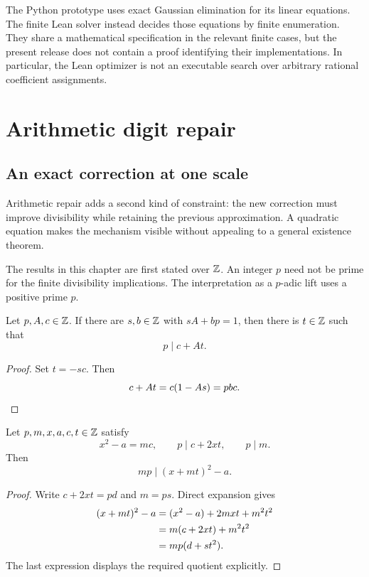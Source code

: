 The Python prototype uses exact Gaussian elimination for its linear equations. The finite Lean solver instead decides those equations by finite enumeration. They share a mathematical specification in the relevant finite cases, but the present release does not contain a proof identifying their implementations. In particular, the Lean optimizer is not an executable search over arbitrary rational coefficient assignments.

\section{Arithmetic digit repair}\label{CR:cr-source-section-6}\label{CR:ch:arithmetic}
\subsection{An exact correction at one scale}
Arithmetic repair adds a second kind of constraint: the new correction must improve divisibility while retaining the previous approximation. A quadratic equation makes the mechanism visible without appealing to a general existence theorem.

The results in this chapter are first stated over $\mathbb{Z}$. An integer $p$ need not be prime for the finite divisibility implications. The interpretation as a $p$-adic lift uses a positive prime $p$.

\begin{CRlemma}\label{CR:lem:digit}
Let $p,A,c\in\mathbb{Z}$. If there are $s,b\in\mathbb{Z}$ with $sA+bp=1$, then there is $t\in\mathbb{Z}$ such that
\[
p\mid c+At.
\]
\end{CRlemma}
\begin{proof}
Set $t=-sc$. Then
\[
c+At=c(1-As)=pbc.\qedhere
\]
\end{proof}

\begin{CRlemma}\label{CR:lem:quad}
Let $p,m,x,a,c,t\in\mathbb{Z}$ satisfy
\[
x^2-a=mc,\qquad p\mid c+2xt,\qquad p\mid m.
\]
Then
\[
mp\mid (x+mt)^2-a.
\]
\end{CRlemma}
\begin{proof}
Write $c+2xt=pd$ and $m=ps$. Direct expansion gives
\begin{align*}
(x+mt)^2-a
&=(x^2-a)+2mxt+m^2t^2\\
&=m(c+2xt)+m^2t^2\\
&=mp(d+st^2).\qedhere
\end{align*}
The last expression displays the required quotient explicitly.
\end{proof}


